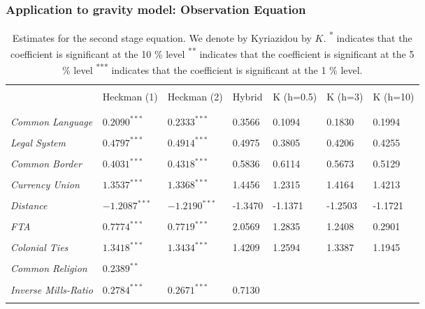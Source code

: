 \begin{frame}
    \frametitle{Application to gravity model: Observation Equation}  
    \begin{table}
        \fontsize{8}{8}\selectfont
        \captionsetup{font=scriptsize}
        \centering
        \begin{tabular}{p{2.6cm}p{1.4cm}p{1.4cm}p{1cm}p{1cm}p{1cm}p{1cm}}
          \hline
          \\[-0.5em]
           \quad  &Heckman (1) & Heckman (2) &Hybrid  & K (h=0.5)  & K (h=3)  & K (h=10)  \\
           \\[-0.5em]
           \hline
           \\[-0.5em]
            \textit{Common Language}  & $0.2090^{***}$ & $0.2333^{***}$& 0.3566 & 0.1094 & 0.1830& 0.1994\\
            \\[-0.5em]
            \textit{Legal System}  & $0.4797^{***}$ & $0.4914^{***}$& 0.4975 & 0.3805& 0.4206&0.4255\\
            \\[-0.5em]
            \textit{Common Border}  & $0.4031^{***}$ & $0.4318^{***}$ & 0.5836& 0.6114 &0.5673 & 0.5129\\
            \\[-0.5em]
            \textit{Currency Union}   & $1.3537^{***}$ & $1.3368^{***}$ & 1.4456 & 1.2315& 1.4164&1.4213\\
            \\[-0.5em]
            \textit{Distance}   & $-1.2087^{***}$ & $-1.2190^{***}$& -1.3470& -1.1371& -1.2503& -1.1721\\
            \\[-0.5em]
            \textit{FTA}  &  $0.7774^{***}$ & $0.7719^{***}$& 2.0569 & 1.2835& 1.2408& 0.2901\\
            \\[-0.5em]
            \textit{Colonial Ties}  & $1.3418^{***}$ & $1.3434^{***}$ & 1.4209 & 1.2594 & 1.3387 & 1.1945\\
            \\[-0.5em]
            \textit{Common Religion}  &  $0.2389^{**}$ &  &  &  &  & \\
            \\[-0.5em]
            \textit{Inverse Mills-Ratio}  & $0.2784^{***}$ & $0.2671^{***}$ & 0.7130& & & \\
             &  & & & & & \\
            \hline
        \end{tabular}
        \caption{\footnotesize{Estimates for the second stage equation. We denote by Kyriazidou by $K$. \newline \textsuperscript{*} indicates that the coefficient is significant at the 10 \% level \newline \textsuperscript{**} indicates that the coefficient is significant at the 5 \% level \newline \textsuperscript{***} indicates that the coefficient is significant at the 1 \% level.}}
        \label{tab:app2}
\end{table}
\end{frame}